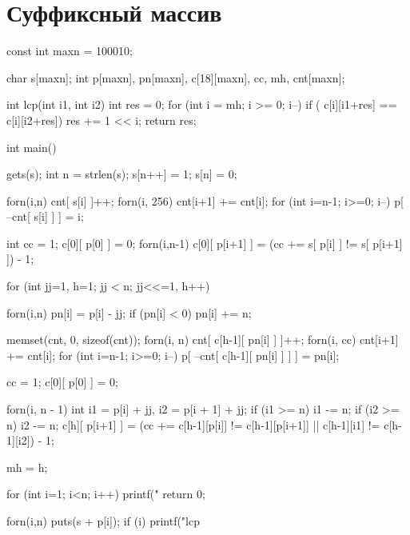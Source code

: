 \documentclass[12pt, titlepage]{article}
\begin{document}
\section{Суффиксный массив}
\begin{cppcode}
const int maxn = 100010;

char s[maxn];
int p[maxn], pn[maxn], c[18][maxn], cc, mh, cnt[maxn];

int lcp(int i1, int i2)
{
  int res = 0;
  for (int i = mh; i >= 0; i--)
    if ( c[i][i1+res] == c[i][i2+res])
      res += 1 << i;
  return res;
}

int main() {
  gets(s);
  int n = strlen(s);
  s[n++] = 1;
  s[n] = 0;

  forn(i,n) cnt[ s[i] ]++;
  forn(i, 256) cnt[i+1] += cnt[i];
  for (int i=n-1; i>=0; i--) p[ --cnt[ s[i] ] ] = i;

  int cc = 1;
  c[0][ p[0] ] = 0;
  forn(i,n-1) c[0][ p[i+1] ] = (cc += s[ p[i] ] != s[ p[i+1] ]) - 1;

  for (int jj=1, h=1; jj < n; jj<<=1, h++) {
    forn(i,n) {
      pn[i] = p[i] - jj;
      if (pn[i] < 0) pn[i] += n;
    }

    memset(cnt, 0, sizeof(cnt));
    forn(i, n) cnt[ c[h-1][ pn[i] ] ]++;
    forn(i, cc) cnt[i+1] += cnt[i];
    for (int i=n-1; i>=0; i--)
    p[ --cnt[ c[h-1][ pn[i] ] ] ] = pn[i];

    cc = 1;
    c[0][ p[0] ] = 0;
     
    forn(i, n - 1) {
      int i1 = p[i] + jj, i2 = p[i + 1] + jj;
      if (i1 >= n) i1 -= n;
      if (i2 >= n) i2 -= n;
      c[h][ p[i+1] ] = (cc += c[h-1][p[i]] != c[h-1][p[i+1]] || c[h-1][i1] != c[h-1][i2]) - 1;
    }

    mh = h;
  }

  for (int i=1; i<n; i++) printf("%
  return 0;

  forn(i,n) {
    puts(s + p[i]);
    if (i)
        printf("lcp %
  }
}
\end{cppcode}
\end{document}
